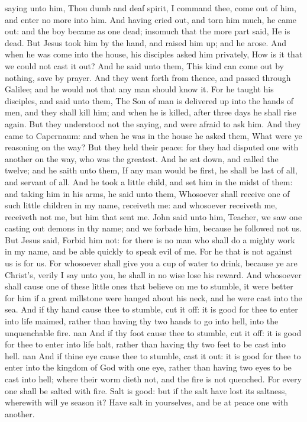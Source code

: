 saying unto him, Thou dumb and deaf spirit, I command thee, come out of him, and enter no more into him. And having cried out, and torn him much, he came out: and the boy became as one dead; insomuch that the more part said, He is dead. But Jesus took him by the hand, and raised him up; and he arose. And when he was come into the house, his disciples asked him privately, How is it that we could not cast it out? And he said unto them, This kind can come out by nothing, save by prayer.  And they went forth from thence, and passed through Galilee; and he would not that any man should know it. For he taught his disciples, and said unto them, The Son of man is delivered up into the hands of men, and they shall kill him; and when he is killed, after three days he shall rise again. But they understood not the saying, and were afraid to ask him.  And they came to Capernaum: and when he was in the house he asked them, What were ye reasoning on the way? But they held their peace: for they had disputed one with another on the way, who was the greatest. And he sat down, and called the twelve; and he saith unto them, If any man would be first, he shall be last of all, and servant of all. And he took a little child, and set him in the midst of them: and taking him in his arms, he said unto them, Whosoever shall receive one of such little children in my name, receiveth me: and whosoever receiveth me, receiveth not me, but him that sent me.  John said unto him, Teacher, we saw one casting out demons in thy name; and we forbade him, because he followed not us. But Jesus said, Forbid him not: for there is no man who shall do a mighty work in my name, and be able quickly to speak evil of me. For he that is not against us is for us. For whosoever shall give you a cup of water to drink, because ye are Christ’s, verily I say unto you, he shall in no wise lose his reward. And whosoever shall cause one of these little ones that believe on me to stumble, it were better for him if a great millstone were hanged about his neck, and he were cast into the sea. And if thy hand cause thee to stumble, cut it off: it is good for thee to enter into life maimed, rather than having thy two hands to go into hell, into the unquenchable fire. nan And if thy foot cause thee to stumble, cut it off: it is good for thee to enter into life halt, rather than having thy two feet to be cast into hell. nan And if thine eye cause thee to stumble, cast it out: it is good for thee to enter into the kingdom of God with one eye, rather than having two eyes to be cast into hell; where their worm dieth not, and the fire is not quenched. For every one shall be salted with fire. Salt is good: but if the salt have lost its saltness, wherewith will ye season it? Have salt in yourselves, and be at peace one with another. 

